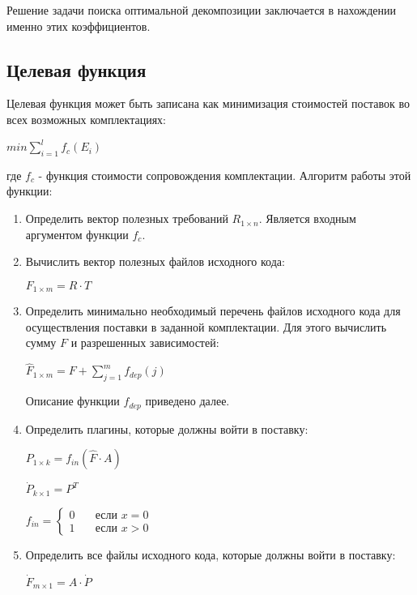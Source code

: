 Решение задачи поиска оптимальной декомпозиции заключается в нахождении именно этих коэффициентов.

\subsection*{Целевая функция}
Целевая функция может быть записана как минимизация стоимостей поставок во всех возможных комплектациях:
\begin{center}
  $\displaystyle min \sum^{l}_{i = 1} f_{c}(E_{i})$
\end{center}

где $f_{c}$ - функция стоимости сопровождения комплектации. Алгоритм работы этой функции:

\begin{enumerate}
  \item Определить вектор полезных требований $R_{1 \times n}$. Является входным аргументом функции $f_{c}$.
  \item Вычислить вектор полезных файлов исходного кода:
  \begin{center}
    $F_{1 \times m} = R \cdot T$
  \end{center}

  \item Определить минимально необходимый перечень файлов исходного кода для осуществления поставки в заданной комплектации. Для этого вычислить сумму $F$ и разрешенных зависимостей: 
  \begin{center}
    $\displaystyle \hat{F}_{1 \times m} = F + \sum^{m}_{j = 1}f_{dep}(j)$
  \end{center}

  Описание функции $f_{dep}$ приведено далее.
  \item Определить плагины, которые должны войти в поставку:
  \begin{center}
    $P_{1 \times k} = f_{in}(\hat{F} \cdot A)$
  \end{center}
  \begin{center}
    $\dot{P}_{k \times 1} = P^{T}$
  \end{center}
  \begin{center}
    $
    f_{in} =
    \begin{cases}
      0 & \quad \text{если } x = 0 \\
      1 & \quad \text{если } x > 0
    \end{cases}
    $
  \end{center}

  \item Определить все файлы исходного кода, которые должны войти в поставку:
  \begin{center}
    $\dot{F}_{m \times 1} = A \cdot \dot{P}$
  \end{center}


\end{enumerate}
